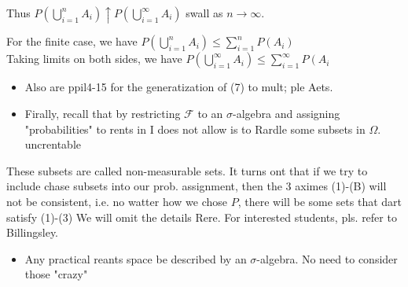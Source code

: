 \documentclass[10pt]{article}
\begin{document}
Thus \(P\left(\bigcup_{i=1}^{n} A_{i}\right) \uparrow P\left(\bigcup_{i=1}^{\infty} A_{i}\right)\) swall as \(n \rightarrow \infty\).

For the finite case, we have \(P\left(\bigcup_{i=1}^{n} A_{i}\right) \leq \sum_{i=1}^{n} P\left(A_{i}\right)\)\\
Taking limits on both sides, we have \(P\left(\bigcup_{i=1}^{\infty} A_{i}\right) \leq \sum_{i=1}^{\infty} P\left(A_{i}\right.\)

\begin{itemize}
  \item Also are ppil4-15 for the generatization of (7) to mult; ple Aets.
\end{itemize}

\begin{itemize}
  \item[-] Firally, recall that by restricting \(\mathcal{F}\) to an \(\sigma\)-algebra and assigning "probabilities" to rents in I does not allow is to Rardle some subsets in \(\Omega\). uncrentable
\end{itemize}

These subsets are called non-measurable sets. It turns ont that if we try to include chase subsets into our prob. assignment, then the 3 aximes (1)-(B) will not be consistent, i.e. no watter how we chose \(P\), there will be some sets that dart satisfy (1)-(3) We will omit the details Rere. For interested students, pls. refer to Billingsley.

\begin{itemize}
  \item[-] Any practical reants space be described by an \(\sigma\)-algebra. No need to consider those "crazy"
\end{itemize}
\end{document}
